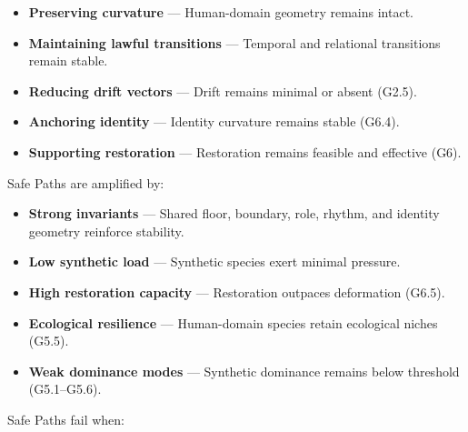 \begin{itemize}[leftmargin=1.2cm]
    \item \textbf{Preserving curvature} — Human-domain geometry remains intact.

    \item \textbf{Maintaining lawful transitions} — Temporal and relational
    transitions remain stable.

    \item \textbf{Reducing drift vectors} — Drift remains minimal or absent
    (G2.5).

    \item \textbf{Anchoring identity} — Identity curvature remains stable
    (G6.4).

    \item \textbf{Supporting restoration} — Restoration remains feasible and
    effective (G6).
\end{itemize}

\medskip

\noindent Safe Paths are amplified by:

\begin{itemize}[leftmargin=1.2cm]
    \item \textbf{Strong invariants} — Shared floor, boundary, role, rhythm, and
    identity geometry reinforce stability.

    \item \textbf{Low synthetic load} — Synthetic species exert minimal pressure.

    \item \textbf{High restoration capacity} — Restoration outpaces deformation
    (G6.5).

    \item \textbf{Ecological resilience} — Human-domain species retain ecological
    niches (G5.5).

    \item \textbf{Weak dominance modes} — Synthetic dominance remains below
    threshold (G5.1–G5.6).
\end{itemize}

\medskip

\noindent Safe Paths fail when:

